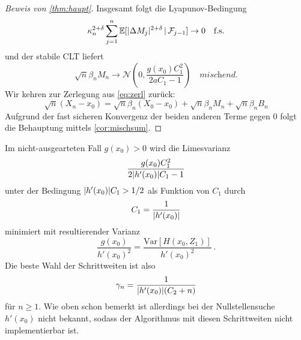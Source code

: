 \documentclass[ngerman,a4paper,11pt]{scrartcl}
\newcommand{\EE}{\mathbb{E}}
\newcommand{\ff}{\mathcal{F}}
\newcommand{\nn}{\mathcal{N}}
\newcommand{\condexp}[2]{\EE[#1\,|\,#2]}
\newcommand{\Var}[1]{\mathrm{Var}[#1]}
\DeclarePairedDelimiter{\abs}{\lvert}{\rvert}		%
\begin{document}
\begin{proof}[Beweis von \cref{thm:haupt}]
Insgesamt folgt die Lyapunov-Bedingung
\begin{equation*}
  \kappa_n^{2+\delta} \sum_{j=1}^n\condexp{\abs{\Delta M_j}^{2+\delta}}{\ff_{j-1}}\to 0\quad\text{f.s.}
\end{equation*}
und der stabile CLT liefert
\begin{equation*}
 \sqrt{n}\beta_nM_n\to\nn\left( 0,\frac{g(x_0)C_1^2}{2aC_1-1} \right)\quad\textit{mischend.}
\end{equation*}
Wir kehren zur Zerlegung aus \cref{eq:zerl} zurück:
\begin{equation*}
 \sqrt{n}(X_n-x_0)=\sqrt{n}\beta_n(X_0-x_0) +\sqrt{n}\beta_nM_n+\sqrt{n}\beta_nB_n
\end{equation*}
Aufgrund der fast sicheren Konvergenz der beiden anderen Terme gegen $0$ folgt die Behauptung mittels \cref{cor:mischsum}.
\end{proof}
\begin{rem}
 Im nicht-ausgearteten Fall $g(x_0)>0$ wird die Limesvarianz
 \begin{equation*}
  \frac{g(x_0)C_1^2}{2\abs{h'(x_0)}C_1-1} 
 \end{equation*}
unter der Bedingung $\abs{h'(x_0)}C_1>1/2$ als Funktion von $C_1$ durch
\begin{equation*}
 C_1=\frac{1}{\abs{h'(x_0)}} 
\end{equation*}
minimiert mit resultierender Varianz
\begin{equation*}
 \frac{g(x_0)}{h'(x_0)^2}=\frac{\Var{H(x_0,Z_1)}}{h'(x_0)^2}\,. 
\end{equation*}
Die beste Wahl der Schrittweiten ist also
\begin{equation*}
 \gamma_n=\frac{1}{\abs{h'(x_0)}(C_2+n)} 
\end{equation*}
für $n\geq 1$. Wie oben schon bemerkt ist allerdings bei der Nullstellensuche
$h'(x_0)$ nicht bekannt, sodass der Algorithmus mit diesen Schrittweiten nicht
implementierbar ist.
\end{rem}
\end{document}
